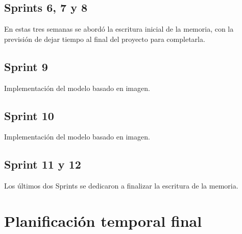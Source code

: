 \subsection{Sprints 6, 7 y 8}

En estas tres semanas se abordó la escritura inicial de la memoria, con la previsión de dejar tiempo al final del proyecto para completarla.

\subsection{Sprint 9}

Implementación del modelo basado en imagen.

\subsection{Sprint 10}

Implementación del modelo basado en imagen.

\subsection{Sprint 11 y 12}

Los últimos dos Sprints se dedicaron a finalizar la escritura de la memoria.

\section{Planificación temporal final}

